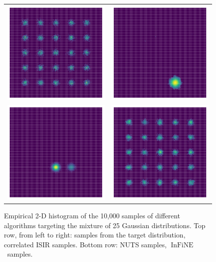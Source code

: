 \documentclass{article}
\def\IFIS{\ensuremath{\operatorname{InFiNE}}}
\def\InFiNE{{\small \IFIS}}
\newcommand{\1}{\mathds{1}}
\begin{document}
\begin{figure}[!ht]
    \centering
    \begin{tabular}{cc}
      \includegraphics[width = .4\linewidth]{histogram_true.pdf}
      &\includegraphics[width = .4\linewidth]{histogram_isir.pdf}  \\
       \includegraphics[width = .4\linewidth]{histogram_nuts.pdf}
       &\includegraphics[width = .4\linewidth]{histogram_infine.pdf}
    \end{tabular}
    \caption{Empirical 2-D histogram of the 10,000 samples of different algorithms targeting the mixture of 25 Gaussian distributions. Top row, from left to right: samples from the target distribution, correlated ISIR samples. Bottom row: NUTS samples, \InFiNE\ samples.}
    \label{fig:25_gauss_mcmc}
\end{figure}
\end{document}
